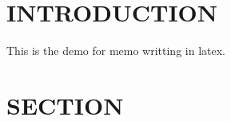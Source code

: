 \newcommand{\WorkWeek}{1307} %
\newcommand{\BossName}{Arden Chang} %
\newcommand{\BossInitials}{ARDN} %
\newcommand{\Author}{Qiling Bo} %
\newcommand{\AuthorInitials}{QIBO} %
\newcommand{\MemoNumber}{087} %
\newcommand{\Subject}{} %
\newcommand{\Category}{} %
\newcommand{\Distribution}{PZHO, MZFA, WEIQ, ARDN, RQB, BMOCHINA} %




\maketitle

\section{INTRODUCTION}
This is the demo for memo writting in latex. \\

\section{SECTION}


